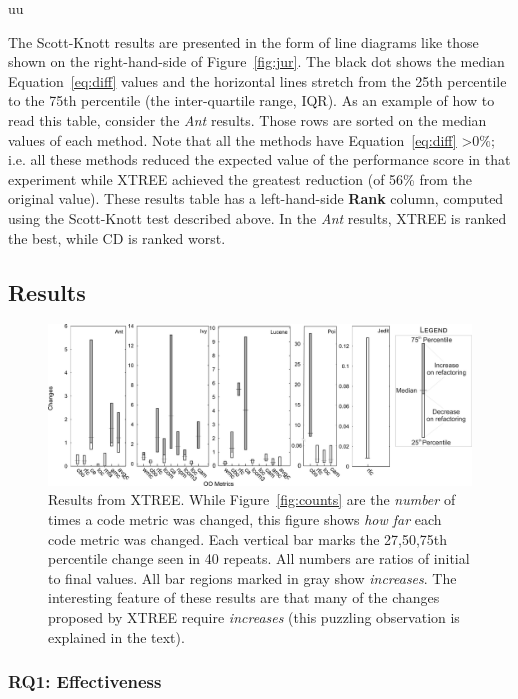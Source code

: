 uu \documentclass[final,twocolumn,5p]{elsarticle}
\newcommand{\fig}[1]{Figure~\ref{fig:#1}}
\newcommand{\eq}[1]{Equation~\ref{eq:#1}}
\theoremstyle{break}
\begin{document}
\begin{itemize}
The Scott-Knott  results are presented in the form of line diagrams like those shown on the right-hand-side of \fig{jur}.
The black dot shows the median \eq{diff} values and the horizontal lines stretch 
from the 25th percentile to the 75th percentile (the inter-quartile range, IQR).
As an example of how to read this table, consider the {\em Ant}
results. Those rows are  sorted on the median values of each method. Note that all the methods have \eq{diff} \textgreater $ 0\%$; i.e. all these methods reduced the expected value of the performance score in that experiment while XTREE achieved the greatest reduction (of 56\% from the original value).
These results table has a  left-hand-side  {\bf Rank} column, computed using the
Scott-Knott test described above. In the {\em Ant}
results, XTREE is ranked the best, while CD is  ranked   worst.


\subsection{Results}
 
 
\begin{figure}[!t]
\centering
\includegraphics[width=\linewidth]{figs/changes01.png}
\caption{Results  from XTREE.
While \fig{counts} are the {\em number} of times a code metric was changed,
this  figure shows {\em how far} each code metric was changed. Each vertical bar
marks the 27,50,75th percentile change seen in 40 repeats.
All numbers are ratios of initial to final values.
All bar regions marked in gray show {\em increases}.
The interesting feature of these results are that many
of the changes proposed by XTREE require {\em increases}
(this puzzling observation is explained in the text).}
\label{fig:changes}
\end{figure}



\subsubsection{RQ1: Effectiveness}


\end{itemize}
\end{document}
